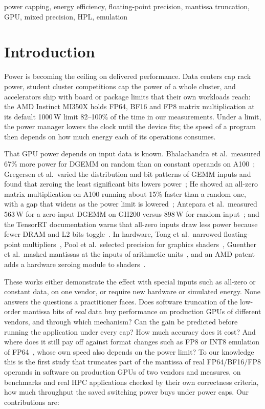 \documentclass[conference]{IEEEtran}
\newcommand{\W}{\,W}
\newcommand{\pct}{\%}
\begin{document}
\begin{IEEEkeywords}
power capping, energy efficiency, floating-point precision, mantissa truncation, GPU, mixed precision, HPL, emulation
\end{IEEEkeywords}

\section{Introduction}

Power is becoming the ceiling on delivered performance. Data centers cap rack power, student cluster competitions
cap the power of a whole cluster, and accelerators ship with board or package limits that their own workloads reach:
the AMD Instinct MI350X holds FP64, BF16 and FP8 matrix multiplication at its default 1000\W{} limit 82--100\pct{} of
the time in our measurements. Under a limit, the power manager lowers the clock until the device fits; the speed of a
program then depends on how much energy each of its operations consumes.

That GPU power depends on input data is known. Bhalachandra et al.\ measured 67\pct{} more power for DGEMM on
random than on constant operands on A100~\cite{Bhalachandra2022}; Gregersen et al.\ varied the distribution and
bit patterns of GEMM inputs and found that zeroing the least significant bits lowers power~\cite{Gregersen2024};
He showed an all-zero matrix multiplication on A100 running about 15\pct{} faster than a random one, with a gap
that widens as the power limit is lowered~\cite{He2024}; Antepara et al.\ measured 563\W{} for a zero-input DGEMM
on GH200 versus 898\W{} for random input~\cite{Antepara2025}; and the TensorRT documentation warns that all-zero
inputs draw less power because fewer DRAM and L2 bits toggle~\cite{TensorRTDocs}. In hardware, Tong et al.\
narrowed floating-point multipliers~\cite{Tong2000}, Pool et al.\ selected precision for graphics
shaders~\cite{Pool2008,Pool2011}, Guenther et al.\ masked mantissas at the inputs of arithmetic
units~\cite{Guenther2016}, and an AMD patent adds a hardware zeroing module to shaders~\cite{AMD2022}.

These works either demonstrate the effect with special inputs such as all-zero or constant data, on one vendor, or
require new hardware or simulated energy. None answers the questions a practitioner faces. Does software truncation of
the low-order mantissa bits of \emph{real} data buy performance on production GPUs of different vendors, and through
which mechanism? Can the gain be predicted before running the application under every cap? How much accuracy does it
cost? And where does it still pay off against format changes such as FP8 or INT8 emulation of
FP64~\cite{Ozaki2025,Uchino2025}, whose own speed also depends on the power limit? To our knowledge this is the first
study that truncates part of the mantissa of real FP64/BF16/FP8 operands in software on production GPUs of two
vendors and measures, on benchmarks and real HPC applications checked by their own correctness criteria, how much
throughput the saved switching power buys under power caps. Our contributions are:
\end{document}
